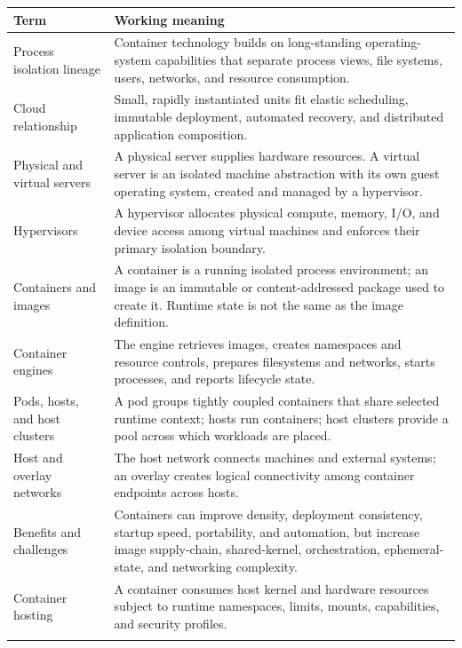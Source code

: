 \documentclass[11pt]{article}
\begin{document}
\begin{longtable}{@{}>{\RaggedRight\arraybackslash}p{}>{\RaggedRight\arraybackslash}p{}@{}}
\toprule\rowcolor{Navy}\color{white}\textbf{Term} & \color{white}\textbf{Working meaning}\\\midrule\endhead
Process isolation lineage & Container technology builds on long-standing operating-system capabilities that separate process views, file systems, users, networks, and resource consumption. \\\addlinespace[2pt]
Cloud relationship & Small, rapidly instantiated units fit elastic scheduling, immutable deployment, automated recovery, and distributed application composition. \\\addlinespace[2pt]
Physical and virtual servers & A physical server supplies hardware resources. A virtual server is an isolated machine abstraction with its own guest operating system, created and managed by a hypervisor. \\\addlinespace[2pt]
Hypervisors & A hypervisor allocates physical compute, memory, I/O, and device access among virtual machines and enforces their primary isolation boundary. \\\addlinespace[2pt]
Containers and images & A container is a running isolated process environment; an image is an immutable or content-addressed package used to create it. Runtime state is not the same as the image definition. \\\addlinespace[2pt]
Container engines & The engine retrieves images, creates namespaces and resource controls, prepares filesystems and networks, starts processes, and reports lifecycle state. \\\addlinespace[2pt]
Pods, hosts, and host clusters & A pod groups tightly coupled containers that share selected runtime context; hosts run containers; host clusters provide a pool across which workloads are placed. \\\addlinespace[2pt]
Host and overlay networks & The host network connects machines and external systems; an overlay creates logical connectivity among container endpoints across hosts. \\\addlinespace[2pt]
Benefits and challenges & Containers can improve density, deployment consistency, startup speed, portability, and automation, but increase image supply-chain, shared-kernel, orchestration, ephemeral-state, and networking complexity. \\\addlinespace[2pt]
Container hosting & A container consumes host kernel and hardware resources subject to runtime namespaces, limits, mounts, capabilities, and security profiles. \\\addlinespace[2pt]

\end{longtable}
\end{document}

